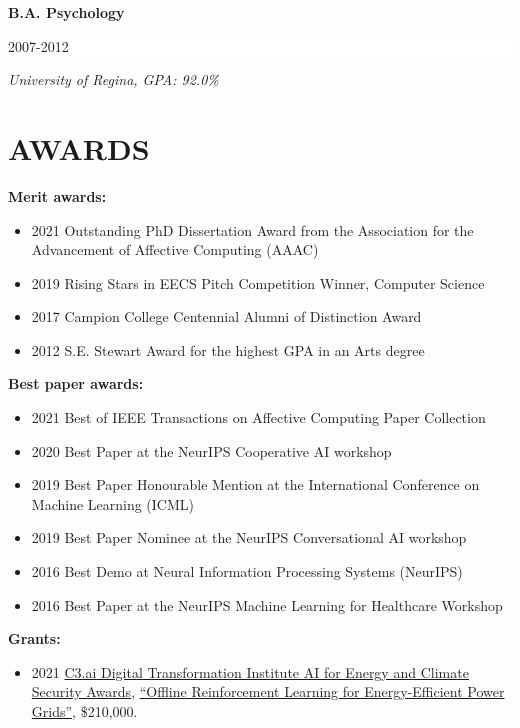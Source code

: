 \documentclass[paper=letter,fontsize=11pt]{scrartcl} %
\newcommand{\NewPart}[2]{\section*{\uppercase{#1} #2}}
\newcommand{\EducationEntry}[3]{
        \noindent \textbf{#1} \hfill      %
        \colorbox{White}{%
            \parbox{10em}{%
            \hfill\color{Black}#2}} \par  %
        \noindent \textit{#3} \par}
\begin{document}
\EducationEntry{B.A. Psychology}{2007-2012}{University of Regina, GPA: 92.0\%}

\NewPart{Awards}{}

\noindent \textbf{Merit awards:}
\begin{itemize}
\item 2021 Outstanding PhD Dissertation Award from the Association for the Advancement of Affective Computing (AAAC) %
\item 2019 Rising Stars in EECS Pitch Competition Winner, Computer Science
\item 2017 Campion College Centennial Alumni of Distinction Award
\item 2012 S.E. Stewart Award for the highest GPA in an Arts degree
\end{itemize}

\noindent \textbf{Best paper awards:}
\begin{itemize}
\item 2021 Best of IEEE Transactions on Affective Computing Paper Collection %
\item 2020 Best Paper at the NeurIPS Cooperative AI workshop
\item 2019 Best Paper Honourable Mention at the International Conference on Machine Learning (ICML)
\item 2019 Best Paper Nominee at the NeurIPS Conversational AI workshop
\item 2016 Best Demo at Neural Information Processing Systems (NeurIPS)
\item 2016 Best Paper at the NeurIPS Machine Learning for Healthcare Workshop
\end{itemize}

\noindent \textbf{Grants:}
\begin{itemize}
\item 2021 \href{https://c3dti.ai/c3-announces-energy-climate-awards/}{C3.ai Digital Transformation Institute AI for Energy and Climate Security Awards}, \href{https://c3.ai/dti/research/2021-projects/}{“Offline Reinforcement Learning for Energy-Efficient Power Grids”}, \$210,000. %
\end{itemize}
\end{document}
